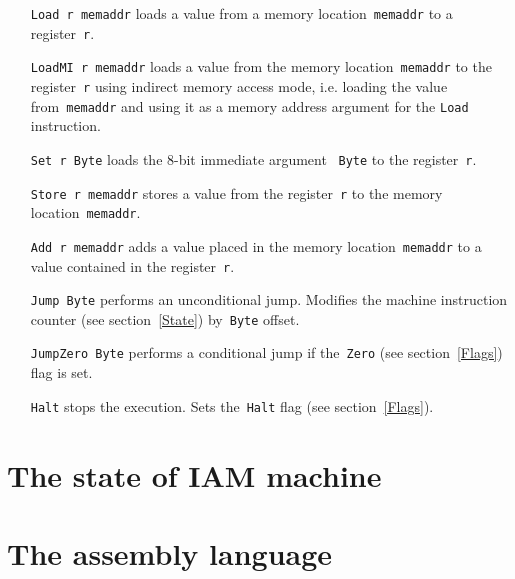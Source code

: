 \begin{itemize}
    \item[\texttt{Load r memaddr}] loads a value from a memory location~\texttt{memaddr} to a register~\texttt{r}.

    \item[\texttt{LoadMI r memaddr}] loads a value from the memory location~\texttt{memaddr} to the register~\texttt{r} using indirect memory access mode, i.e. loading the value from~\texttt{memaddr} and using it as a memory address argument for the \texttt{Load} instruction.

    \item[\texttt{Set r Byte}] loads the 8-bit immediate argument ~\texttt{Byte} to the register~\texttt{r}.

    \item[\texttt{Store r memaddr}] stores a value from the register~\texttt{r} to the memory location~\texttt{memaddr}.

    \item[\texttt{Add r memaddr}] adds a value placed in the memory location~\texttt{memaddr} to a value contained in the register~\texttt{r}.

    \item[\texttt{Jump Byte}] performs an unconditional jump. Modifies the machine instruction counter (see section~\ref{State}) by~\texttt{Byte} offset.

    \item[\texttt{JumpZero Byte}] performs a conditional jump if the~\texttt{Zero} (see section~\ref{Flags}) flag is set.

    \item[\texttt{Halt}] stops the execution. Sets the~\texttt{Halt} flag (see section~\ref{Flags}).
\end{itemize}

\section{The state of IAM machine}



\section{The assembly language}

